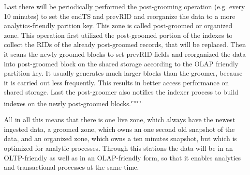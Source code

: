 Last there will be periodically performed the post-grooming operation (e.g. every 10 minutes) to set the endTS and prevRID and reorganize the data to a more analytics-friendly parition key. This zone is called post-groomed or organized zone. This operation first utilized the post-groomed portion of the indexes to collect the RIDs of the already post-groomed records, that will be replaced. Then it scans the newly groomed blocks to set prevRID fields and reorganized the data into post-groomed block on the shared storage according to the OLAP friendly partition key. It usually generates much larger blocks than the groomer, because it is carried out less frequently. This results in better access performance on shared storage. Last the post-groomer also notifies the indexer process to build indexes on the newly post-groomed blocks.\textsuperscript{cmp.\cite{30}}

All in all this means that there is one live zone, which always have the newest ingested data, a groomed zone, which owns an one second old snapshot of the data, and an organized zone, which owns a ten minutes snapshot, but which is optimized for analytic processes. Through this stations the data will be in an OLTP-friendly as well as in an OLAP-friendly form, so that it enables analytics and transactional processes at the same time. 


